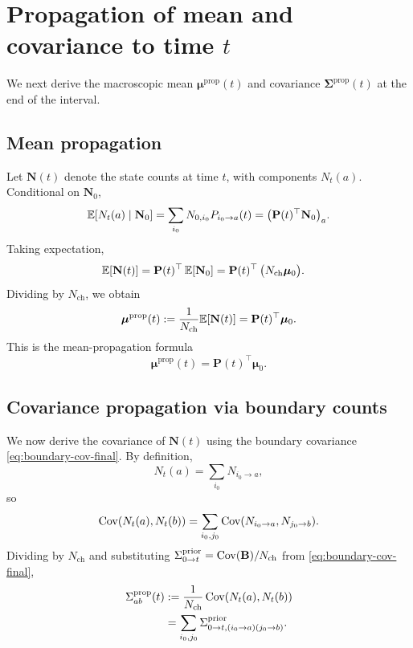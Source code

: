 \documentclass[11pt]{article}
\begin{document}

\section{Propagation of mean and covariance to time \texorpdfstring{$t$}{t}}

We next derive the macroscopic mean
\(\boldsymbol{\mu}^{\text{prop}}(t)\) and covariance
\(\boldsymbol{\Sigma}^{\text{prop}}(t)\) at the end of the interval.

\subsection{Mean propagation}

Let \(\mathbf{N}(t)\) denote the state counts at time \(t\), with components
\(N_t(a)\). Conditional on \(\mathbf{N}_0\),
\[
  \mathbb{E}[N_t(a)\mid \mathbf{N}_0]
  =
  \sum_{i_0} N_{0,i_0}P_{i_0\to a}(t)
  =
  \bigl(\mathbf{P}(t)^\top\mathbf{N}_0\bigr)_a.
\]
Taking expectation,
\begin{align}
  \mathbb{E}[\mathbf{N}(t)]
  &=
  \mathbf{P}(t)^\top\,\mathbb{E}[\mathbf{N}_0]
  =
  \mathbf{P}(t)^\top\,
  \bigl(N_{\text{ch}}\boldsymbol{\mu}_0\bigr).
\end{align}
Dividing by \(N_{\text{ch}}\), we obtain
\[
  \boldsymbol{\mu}^{\text{prop}}(t)
  :=
  \frac{1}{N_{\text{ch}}}\mathbb{E}[\mathbf{N}(t)]
  =
  \mathbf{P}(t)^\top\boldsymbol{\mu}_0.
\]
This is the mean-propagation formula
\[
  \boxed{
    \boldsymbol{\mu}^{\text{prop}}(t)
    =
    \mathbf{P}(t)^\top\boldsymbol{\mu}_0.
  }
\]

\subsection{Covariance propagation via boundary counts}

We now derive the covariance of \(\mathbf{N}(t)\) using the boundary covariance
\eqref{eq:boundary-cov-final}. By definition,
\[
  N_t(a) = \sum_{i_0} N_{i_0\to a},
\]
so
\[
  \operatorname{Cov}(N_t(a),N_t(b))
  =
  \sum_{i_0,j_0}
  \operatorname{Cov}(N_{i_0\to a},N_{j_0\to b}).
\]
Dividing by \(N_{\text{ch}}\) and substituting
\(\Sigma^{\text{prior}}_{0\to t} = \operatorname{Cov}(\mathbf{B})/N_{\text{ch}}\) from
\eqref{eq:boundary-cov-final},
\begin{align}
  \Sigma^{\text{prop}}_{ab}(t)
  &:=
  \frac{1}{N_{\text{ch}}}
  \operatorname{Cov}(N_t(a),N_t(b))
  \nonumber\\
  &=
  \sum_{i_0,j_0}
  \Sigma^{\text{prior}}_{0\to t,(i_0\to a)(j_0\to b)}.
  \label{eq:Sigma-prop-def}
\end{align}
\end{document}
